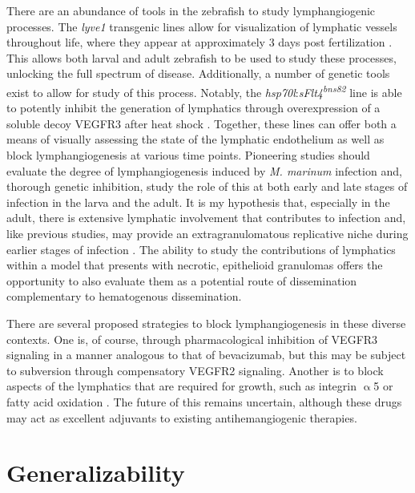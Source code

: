 There are an abundance of tools in the zebrafish to study lymphangiogenic processes. The \textit{lyve1} transgenic lines allow for visualization of lymphatic vessels throughout life, where they appear at approximately 3 days post fertilization \citep{Okuda2012}. This allows both larval and adult zebrafish to be used to study these processes, unlocking the full spectrum of disease. Additionally, a number of genetic tools exist to allow for study of this process. Notably, the \textit{hsp70l}:\textit{sFlt4\textsuperscript{bns82}} line is able to potently inhibit the generation of lymphatics through overexpression of a soluble decoy VEGFR3 after heat shock \citep{Matsuoka2016}. Together, these lines can offer both a means of visually assessing the state of the lymphatic endothelium as well as block lymphangiogenesis at various time points. Pioneering studies should evaluate the degree of lymphangiogenesis induced by \textit{M. marinum} infection and, thorough genetic inhibition, study the role of this at both early and late stages of infection in the larva and the adult. It is my hypothesis that, especially in the adult, there is extensive lymphatic involvement that contributes to infection and, like previous studies, may provide an extragranulomatous replicative niche during earlier stages of infection \citep{Lerner2016}. The ability to study the contributions of lymphatics within a model that presents with necrotic, epithelioid granulomas offers the opportunity to also evaluate them as a potential route of dissemination complementary to hematogenous dissemination. 

There are several proposed strategies to block lymphangiogenesis in these diverse contexts. One is, of course, through pharmacological inhibition of VEGFR3 signaling in a manner analogous to that of bevacizumab, but this may be subject to subversion through compensatory VEGFR2 signaling. Another is to block aspects of the lymphatics that are required for growth, such as integrin $\upalpha$5 \citep{Dietrich2007} or fatty acid oxidation \citep{Wong2017b}. The future of this remains uncertain, although these drugs may act as excellent adjuvants to existing antihemangiogenic therapies.

\section{Generalizability}\label{generalizability}

